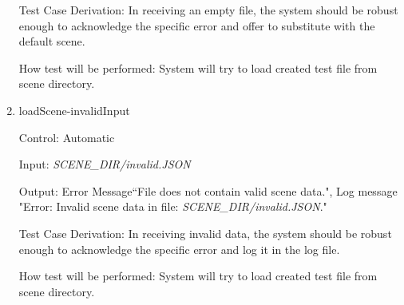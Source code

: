 \documentclass[12pt, titlepage]{article}
\begin{document}
\begin{enumerate}
Test Case Derivation: In receiving an empty file, the system should be robust 
enough to acknowledge the specific error and offer to substitute with the 
default scene.

How test will be performed: System will try to load created test file from 
scene directory.

\item{loadScene-invalidInput\\}

Control: Automatic

Input: \textit{SCENE\_DIR/invalid.JSON}

Output: Error Message``File does not contain valid scene data.", Log message 
"Error: Invalid scene data in file: \textit{SCENE\_DIR/invalid.JSON}."

Test Case Derivation: In receiving invalid data, the system should be robust 
enough to acknowledge the specific error and log it in the log file.

How test will be performed: System will try to load created test file from 
scene directory.

\end{enumerate}
\end{document}
